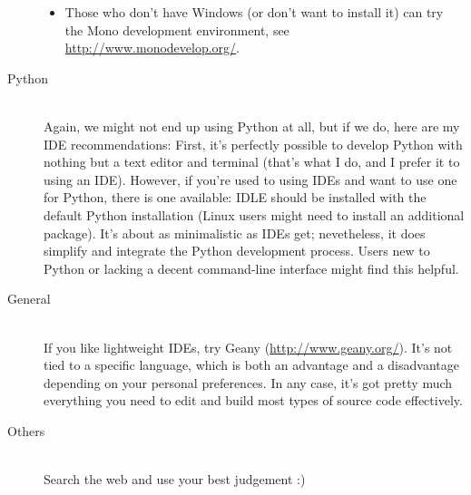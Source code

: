 \documentclass[12pt]{article}
\begin{document}
\begin{description}
\begin{itemize}
            \item Those who don't have Windows (or don't want to install it) can try the Mono development environment, see \url{http://www.monodevelop.org/}. 
        \end{itemize}
    \item[Python] \hfill \\
        Again, we might not end up using Python at all, but if we do, here are my IDE recommendations: First, it's perfectly possible to develop Python with nothing but a text editor and terminal (that's what I do, and I prefer it to using an IDE). However, if you're used to using IDEs and want to use one for Python, there is one available: IDLE should be installed with the default Python installation (Linux users might need to install an additional package). It's about as minimalistic as IDEs get; nevetheless, it does simplify and integrate the Python development process. Users new to Python or lacking a decent command-line interface might find this helpful.
    \item[General] \hfill \\
        If you like lightweight IDEs, try Geany (\url{http://www.geany.org/}). It's not tied to a specific language, which is both an advantage and a disadvantage depending on your personal preferences. In any case, it's got pretty much everything you need to edit and build most types of source code effectively.
    \item[Others] \hfill \\
        Search the web and use your best judgement :)
\end{description}
\end{document}
